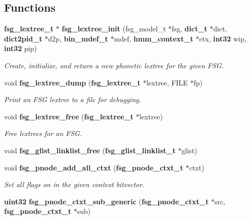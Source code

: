 \subsection*{\-Functions}
\begin{DoxyCompactItemize}
\item 
{\bf fsg\-\_\-lextree\-\_\-t} $\ast$ {\bf fsg\-\_\-lextree\-\_\-init} (fsg\-\_\-model\-\_\-t $\ast$fsg, {\bf dict\-\_\-t} $\ast$dict, {\bf dict2pid\-\_\-t} $\ast$d2p, {\bf bin\-\_\-mdef\-\_\-t} $\ast$mdef, {\bf hmm\-\_\-context\-\_\-t} $\ast$ctx, {\bf int32} wip, {\bf int32} pip)\label{fsg__lextree_8c_a8c47b2983b3952886a4c889a711e1d65}

\begin{DoxyCompactList}\small\item\em \-Create, initialize, and return a new phonetic lextree for the given \-F\-S\-G. \end{DoxyCompactList}\item 
void {\bf fsg\-\_\-lextree\-\_\-dump} ({\bf fsg\-\_\-lextree\-\_\-t} $\ast$lextree, \-F\-I\-L\-E $\ast$fp)\label{fsg__lextree_8c_a5c267f09b8dc214dd7deb41232d84726}

\begin{DoxyCompactList}\small\item\em \-Print an \-F\-S\-G lextree to a file for debugging. \end{DoxyCompactList}\item 
void {\bf fsg\-\_\-lextree\-\_\-free} ({\bf fsg\-\_\-lextree\-\_\-t} $\ast$lextree)\label{fsg__lextree_8c_a2f1ab965df1214f4d0e2008833aa20da}

\begin{DoxyCompactList}\small\item\em \-Free lextrees for an \-F\-S\-G. \end{DoxyCompactList}\item 
void {\bfseries fsg\-\_\-glist\-\_\-linklist\-\_\-free} ({\bf fsg\-\_\-glist\-\_\-linklist\-\_\-t} $\ast$glist)\label{fsg__lextree_8c_a3931da8d9c5b2709c58755d5f15faaf5}

\item 
void {\bf fsg\-\_\-pnode\-\_\-add\-\_\-all\-\_\-ctxt} ({\bf fsg\-\_\-pnode\-\_\-ctxt\-\_\-t} $\ast$ctxt)\label{fsg__lextree_8c_a98fd94d024df264025e30c909c82cb56}

\begin{DoxyCompactList}\small\item\em \-Set all flags on in the given context bitvector. \end{DoxyCompactList}\item 
{\bf uint32} {\bf fsg\-\_\-pnode\-\_\-ctxt\-\_\-sub\-\_\-generic} ({\bf fsg\-\_\-pnode\-\_\-ctxt\-\_\-t} $\ast$src, {\bf fsg\-\_\-pnode\-\_\-ctxt\-\_\-t} $\ast$sub)\label{fsg__lextree_8c_aa9ff81fb4f5d873188fcf3be3f5fc18e}


\end{DoxyCompactItemize}
